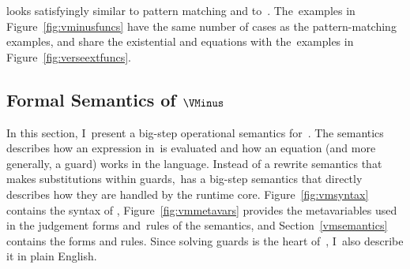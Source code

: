 \documentclass[manuscript,screen 12pt, nonacm]{acmart}
\begin{document}
    \VMinus looks satisfyingly similar to pattern matching and to~\VC.
    The~\VMinus examples in Figure~\ref{fig:vminusfuncs} have the same number of
    cases as the pattern-matching examples, and share the existential and
    equations with the~\VC examples in Figure~\ref{fig:verseextfuncs}. 
   




\pagebreak
\subsection{Formal Semantics of $\VMinus$}
    In this section, I~present a big-step operational semantics for~\VMinus. The
    semantics describes how an expression in~\VMinus is evaluated and how an
    equation (and more generally, a guard) works in the language. Instead of a
    rewrite semantics that makes substitutions within guards,~\VMinus has a
    big-step semantics that directly describes how they are handled by the
    runtime core. Figure~\ref{fig:vmsyntax} contains the syntax of \VMinus,
    Figure~\ref{fig:vmmetavars} provides the metavariables used in the judgement
    forms and~rules of the semantics, and Section~\ref{vmsemantics} contains the
    forms and rules. Since solving guards is the heart of~\VMinus, I~also
    describe it in plain English.
\end{document}
